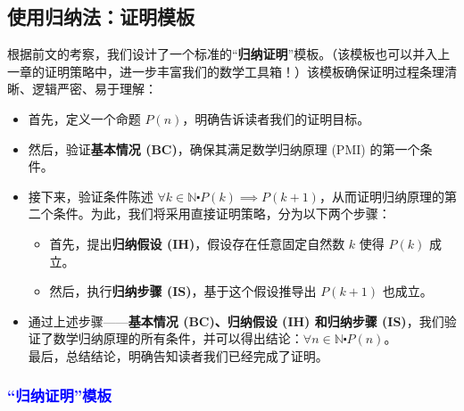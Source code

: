 \subsection{使用归纳法：证明模板}

根据前文的考察，我们设计了一个标准的``\textbf{归纳证明}''模板。（该模板也可以并入上一章的证明策略中，进一步丰富我们的数学工具箱！）该模板确保证明过程条理清晰、逻辑严密、易于理解：

\begin{itemize}
    \item 首先，定义一个命题 $P(n)$，明确告诉读者我们的证明目标。
    \item 然后，验证\textbf{基本情况 (BC)}，确保其满足数学归纳原理 (PMI) 的第一个条件。
    \item 接下来，验证条件陈述 $\forall k \in \mathbb{N} \centerdot P(k) \implies P(k+1)$，从而证明归纳原理的第二个条件。为此，我们将采用直接证明策略，分为以下两个步骤：
        \begin{itemize}
            \item 首先，提出\textbf{归纳假设 (IH)}，假设存在任意固定自然数 $k$ 使得 $P(k)$ 成立。
            \item 然后，执行\textbf{归纳步骤 (IS)}，基于这个假设推导出 $P(k+1)$ 也成立。
        \end{itemize} 
    \item 通过上述步骤——\textbf{基本情况 (BC)、归纳假设 (IH) 和归纳步骤 (IS)}，我们验证了数学归纳原理的所有条件，并可以得出结论：$\forall n \in \mathbb{N} \centerdot P(n)$。
    \\
    最后，总结结论，明确告知读者我们已经完成了证明。
\end{itemize}

\subsubsection*{\textcolor{blue}{``归纳证明''模板}}

\setlength{\fboxrule}{2pt}
\setlength\fboxsep{5mm}
\begin{center}
\noindent {}
\end{center}


